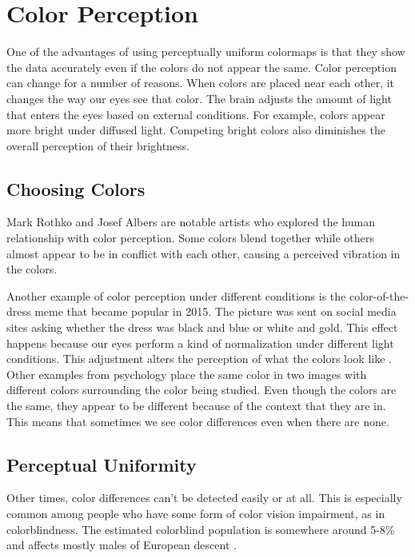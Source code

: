 \documentclass[journal,12pt]{IEEEtran}
\begin{document}
\section{Color Perception}

One of the advantages of using perceptually uniform colormaps is
that they show the data accurately even if the colors do not appear
the same. Color perception can change for a number of reasons. When 
colors are placed near each other, it changes the way our eyes see that color.
The brain adjusts the amount of light that enters the eyes based
on external conditions. For example, colors appear more bright under diffused
light. Competing bright colors also diminishes the overall perception
of their brightness.

\subsection{Choosing Colors}

Mark Rothko and Josef Albers are notable artists who explored the human relationship
with color perception. Some colors blend together while others almost appear to be in
conflict with each other, causing a perceived vibration in the colors.

Another example of color perception under different conditions is the 
color-of-the-dress meme that became popular in 2015. The picture was
sent on social media sites asking whether the dress was black and blue
or white and gold. This effect happens because our eyes perform a kind 
of normalization under different light conditions. This adjustment alters
the perception of what the colors look like \cite{viridis}. Other examples from psychology 
place the same color in two images with different colors surrounding the
color being studied. Even though the colors are the same, they appear to be 
different because of the context that they are in. This means that sometimes
we see color differences even when there are none.

\subsection{Perceptual Uniformity}

Other times, color differences can't be detected easily or at all. This is 
especially common among people who have some form of color vision impairment,
as in colorblindness. The estimated colorblind population is somewhere around 5-8\%
and affects mostly males of European descent \cite{colormapping}.
\end{document}
